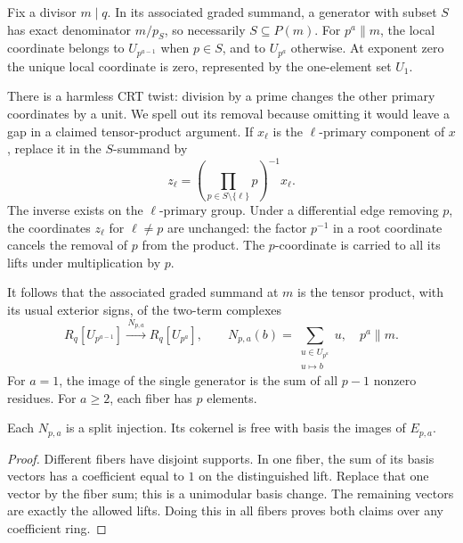 Fix a divisor $m\mid q$. In its associated graded summand, a generator
with subset $S$ has exact denominator $m/p_S$, so necessarily
$S\subseteq P(m)$. For $p^a\parallel m$, the local coordinate belongs
to $U_{p^{a-1}}$ when $p\in S$, and to $U_{p^a}$ otherwise. At exponent
zero the unique local coordinate is zero, represented by the one-element
set $U_1$.

There is a harmless CRT twist: division by a prime changes the other
primary coordinates by a unit. We spell out its removal because omitting
it would leave a gap in a claimed tensor-product argument. If $x_\ell$
is the $\ell$-primary component of $x$, replace it in the $S$-summand by
\begin{equation}\label{ir:eq:gauge}
 z_\ell=\left(\prod_{p\in S\setminus\{\ell\}}p\right)^{-1}x_\ell.
\end{equation}
The inverse exists on the $\ell$-primary group. Under a differential
edge removing $p$, the coordinates $z_\ell$ for $\ell\ne p$ are
unchanged: the factor $p^{-1}$ in a root coordinate cancels the removal
of $p$ from the product. The $p$-coordinate is carried to all its lifts
under multiplication by $p$.

It follows that the associated graded summand at $m$ is the tensor
product, with its usual exterior signs, of the two-term complexes
\begin{equation}\label{ir:eq:local-complex}
 R_q[U_{p^{a-1}}]\xrightarrow{\,N_{p,a}\,}R_q[U_{p^a}],
 \qquad
 N_{p,a}(b)=\sum_{\substack{u\in U_{p^a}\\u\mapsto b}}u,
 \quad p^a\parallel m.
\end{equation}
For $a=1$, the image of the single generator is the sum of all $p-1$
nonzero residues. For $a\ge2$, each fiber has $p$ elements.

\begin{lemma}\label{ir:lem:local-splitting}
Each $N_{p,a}$ is a split injection. Its cokernel is free with basis the
images of $E_{p,a}$.
\end{lemma}
\begin{proof}
Different fibers have disjoint supports. In one fiber, the sum of its
basis vectors has a coefficient equal to $1$ on the distinguished lift.
Replace that one vector by the fiber sum; this is a unimodular basis
change. The remaining vectors are exactly the allowed lifts. Doing this
in all fibers proves both claims over any coefficient ring.
\end{proof}

